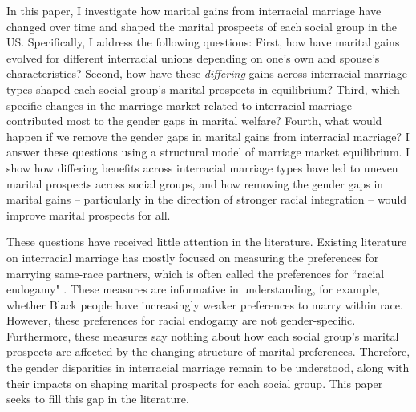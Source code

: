 
In this paper, I investigate how marital gains from interracial marriage have changed over time and shaped the marital prospects of each social group in the US. Specifically, I address the following questions: First, how have marital gains evolved for different interracial unions depending on one's own and spouse's characteristics? Second, how have these \textit{differing} gains across interracial marriage types shaped each social group's marital prospects in equilibrium? Third, which specific changes in the marriage market related to interracial marriage contributed most to the gender gaps in marital welfare?  Fourth, what would happen if we remove the gender gaps in marital gains from interracial marriage? I answer these questions using a structural model of marriage market equilibrium. I show how differing benefits across interracial marriage types have led to uneven marital prospects across social groups, and how removing the gender gaps in marital gains --  particularly in the direction of stronger racial integration -- would improve marital prospects for all. 


%

These questions have received little attention in the literature. Existing literature on interracial marriage has mostly focused on measuring the preferences for marrying same-race partners, which is often called the preferences for ``racial endogamy" \citep{QianLichter_2011_InterracialMarriage, CiscatoWeber_2020_EvolvingMaritalPreferences, AnderbergVickery_2021_EthnicMaritalSortingUK}. These measures are informative in understanding, for example, whether Black people have increasingly weaker preferences to marry within race. However, these preferences for racial endogamy are not gender-specific. Furthermore, these measures say nothing about how each social group's marital prospects are affected by the changing structure of marital preferences. Therefore, the gender disparities in interracial marriage remain to be understood, along with their impacts on shaping marital prospects for each social group. This paper seeks to fill this gap in the literature. 


